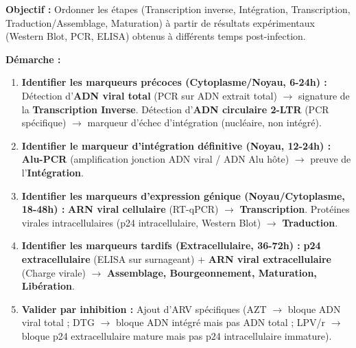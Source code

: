 \documentclass[11pt]{article}
\begin{document}
\begin{methode}
\textbf{Objectif :} Ordonner les étapes (Transcription inverse, Intégration, Transcription, Traduction/Assemblage, Maturation) à partir de résultats expérimentaux (Western Blot, PCR, ELISA) obtenus à différents temps post-infection.
\par \textbf{Démarche :}
\begin{enumerate}
    \item \textbf{Identifier les marqueurs précoces (Cytoplasme/Noyau, 6-24h) :} Détection d'\textbf{ADN viral total} (PCR sur ADN extrait total) $\to$ signature de la \textbf{Transcription Inverse}. Détection d'\textbf{ADN circulaire 2-LTR} (PCR spécifique) $\to$ marqueur d'échec d'intégration (nucléaire, non intégré).
    \item \textbf{Identifier le marqueur d'intégration définitive (Noyau, 12-24h) :} \textbf{Alu-PCR} (amplification jonction ADN viral / ADN Alu hôte) $\to$ preuve de l'\textbf{Intégration}.
    \item \textbf{Identifier les marqueurs d'expression génique (Noyau/Cytoplasme, 18-48h) :} \textbf{ARN viral cellulaire} (RT-qPCR) $\to$ \textbf{Transcription}. Protéines virales intracellulaires (p24 intracellulaire, Western Blot) $\to$ \textbf{Traduction}.
    \item \textbf{Identifier les marqueurs tardifs (Extracellulaire, 36-72h) :} \textbf{p24 extracellulaire} (ELISA sur surnageant) + \textbf{ARN viral extracellulaire} (Charge virale) $\to$ \textbf{Assemblage, Bourgeonnement, Maturation, Libération}.
    \item \textbf{Valider par inhibition :} Ajout d'ARV spécifiques (AZT $\to$ bloque ADN viral total ; DTG $\to$ bloque ADN intégré mais pas ADN total ; LPV/r $\to$ bloque p24 extracellulaire mature mais pas p24 intracellulaire immature).
\end{enumerate}
\end{methode}
\end{document}
